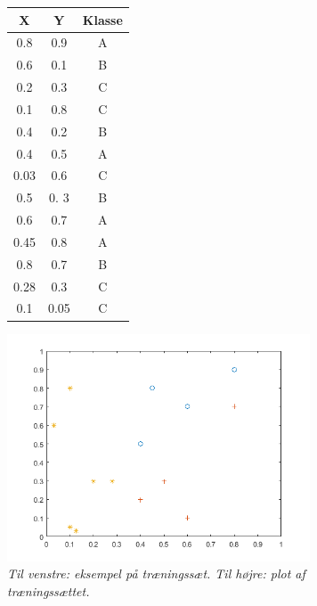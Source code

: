 \documentclass{article}
\begin{document}
\begin{figure}[H]
	\begin{minipage}[t]{0.27\linewidth}
		\begin{flushleft}
			\begin{tabular}{c|c|c}
				X & Y & Klasse\\
				\hline
				0.8 & 0.9 & A\\
				0.6 & 0.1 & B\\
				0.2 & 0.3 & C\\
				0.1 & 0.8 & C\\
				0.4 & 0.2 & B\\
				0.4 & 0.5 & A\\
				0.03 & 0.6 & C\\
				0.5 & 0. 3 & B\\
				0.6 & 0.7 & A\\
				0.45 & 0.8 & A\\
				0.8 & 0.7 & B\\
				0.28 & 0.3 & C\\
				0.1 & 0.05 & C
			\end{tabular}
		\end{flushleft}
	\end{minipage}
	\begin{minipage}[t]{0.25\linewidth}
		\begin{flushright}
			\includegraphics[width=9cm]{decision_tree_example_plot}
		\end{flushright}
	\end{minipage}
	\caption{\textit{Til venstre: eksempel på træningssæt. Til højre: plot af træningssættet.}}
\end{figure}
\end{document}
